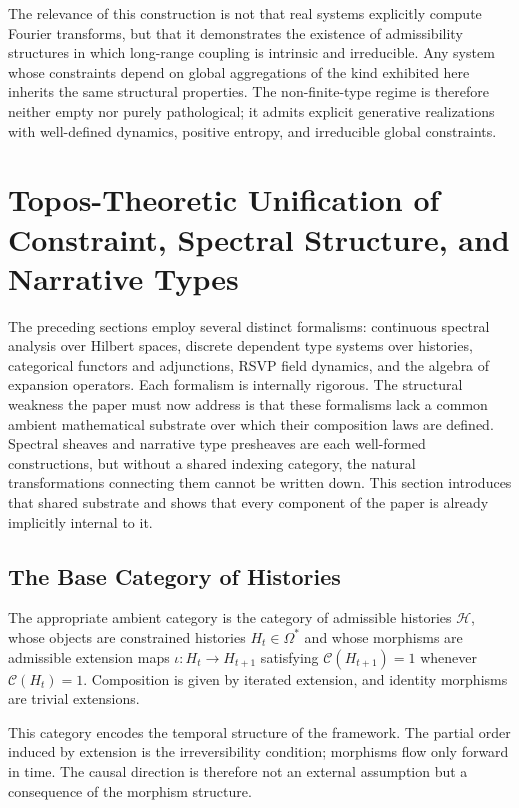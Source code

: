 \documentclass[12pt, a4paper]{article}
\theoremstyle{plain}
\theoremstyle{definition}
\theoremstyle{remark}
\begin{document}
The relevance of this construction is not that real systems explicitly compute Fourier transforms, but that it demonstrates the existence of admissibility structures in which long-range coupling is intrinsic and irreducible. Any system whose constraints depend on global aggregations of the kind exhibited here inherits the same structural properties. The non-finite-type regime is therefore neither empty nor purely pathological; it admits explicit generative realizations with well-defined dynamics, positive entropy, and irreducible global constraints.

\section{Topos-Theoretic Unification of Constraint, Spectral Structure, and Narrative Types}

The preceding sections employ several distinct formalisms: continuous spectral analysis over Hilbert spaces, discrete dependent type systems over histories, categorical functors and adjunctions, RSVP field dynamics, and the algebra of expansion operators. Each formalism is internally rigorous. The structural weakness the paper must now address is that these formalisms lack a common ambient mathematical substrate over which their composition laws are defined. Spectral sheaves and narrative type presheaves are each well-formed constructions, but without a shared indexing category, the natural transformations connecting them cannot be written down. This section introduces that shared substrate and shows that every component of the paper is already implicitly internal to it.

\subsection{The Base Category of Histories}

The appropriate ambient category is the category of admissible histories $\mathcal{H}$, whose objects are constrained histories $H_t \in \Omega^*$ and whose morphisms are admissible extension maps $\iota : H_t \to H_{t+1}$ satisfying $\mathcal{C}(H_{t+1}) = 1$ whenever $\mathcal{C}(H_t) = 1$. Composition is given by iterated extension, and identity morphisms are trivial extensions.

This category encodes the temporal structure of the framework. The partial order induced by extension is the irreversibility condition; morphisms flow only forward in time. The causal direction is therefore not an external assumption but a consequence of the morphism structure.
\end{document}

